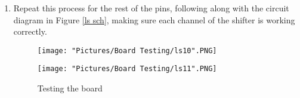 \documentclass[12pt]{article}
\begin{document}
\begin{enumerate}
	\item Repeat this process for the rest of the pins, following along with the circuit diagram in Figure \ref{ls sch}, making sure each channel of the shifter is working correctly. 

\begin{figure}[H]
 	\centering
  	\begin{minipage}[b]{0.45\textwidth}
		\texttt{[image: "Pictures/Board Testing/ls10".PNG]}
  	\end{minipage}
  	\hfill
  	\begin{minipage}[b]{0.45\textwidth}
    		\texttt{[image: "Pictures/Board Testing/ls11".PNG]}
  	\end{minipage}
	\caption{Testing the board}
\end{figure}

\end{enumerate}
\end{document}
